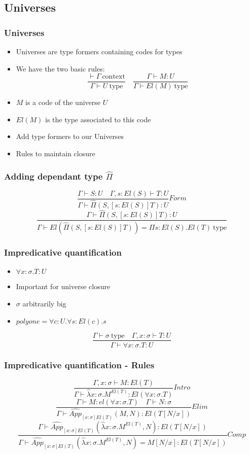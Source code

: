 \documentclass[aspectratio=169]{beamer}
\newcommand{\cntxt}{\ \mathrm{context}}
\newcommand{\typ}{\ \mathrm{type}}
\newcommand{\C}{Comp}
\newcommand{\Intro}{Intro}
\newcommand{\F}{Form}
\newcommand{\E}{Elim}
\newcommand{\Pich}{\hat{\Pi}}
\newcommand{\Appch}[2]{\hat{App}_{[x:\sigma]El(T)}(#1,#2)}
\newcommand{\lambdach}{\hat{\lambda} x:\sigma.M^{El(T)}}
\newcommand{\Gamdash}{\Gamma\vdash}
\begin{document}
    \subsection{Universes}
    \begin{frame}
        \frametitle{Universes}
        \begin{itemize}
            \item Universes are type formers containing codes for types
            \item We have the two basic rules:
            $$\frac{\vdash \Gamma \cntxt}{\Gamma \vdash U \typ}\quad\frac{\Gamma \vdash M:U}{\Gamdash El(M)\typ}$$
            \item $M$ is a code of the universe $U$
            \item $El(M)$ is the type associated to this code
            \item Add type formers to our Universes
            \item Rules to maintain closure
        \end{itemize}
    \end{frame}
    \begin{frame}
        \frametitle{Adding dependant type $\Pich$}
        $$\frac{\Gamma \vdash S:U\quad \Gamma,s:El(S)\vdash T:U}{\Gamma \vdash \Pich(S,[s:El(S)]T):U}\F$$
        \vspace{15pt}
        $$\frac{\Gamdash\Pich(S,[s:El(S)]T):U}{\Gamdash El(\Pich(S,[s:El(S)]T)) = \Pi s:El(S).El(T) \typ}$$
    \end{frame}
    \begin{frame}
        \frametitle{Impredicative quantification}
        \begin{itemize}
            \item $\forall x:\sigma.T:U$
            \item Important for universe closure
            \item $\sigma$ arbitrarily big
            \item $polyone = \forall c:U.\forall s:El(c).s$
        \end{itemize}
        \vspace{15pt}
        $$\frac{\Gamdash\sigma\typ\quad\Gamma,x:\sigma\vdash T:U}{\Gamdash\forall x:\sigma.T:U}$$
    \end{frame}
    \begin{frame}
        \frametitle{Impredicative quantification - Rules}
        $$\frac{\Gamma,x:\sigma\vdash M:El(T)}{\Gamdash\lambdach:El(\forall x:\sigma.T)}\Intro$$
        \vspace{10pt}
        $$\frac{\Gamdash M:el(\forall x:\sigma.T)\quad\Gamdash N:\sigma}{\Gamdash\Appch{M}{N}:El(T[N/x])}\E$$
        \vspace{10pt}
        $$\frac{\Gamdash\Appch{\lambdach}{N}:El(T[N/x])}{\Gamdash\Appch{\lambdach}{N}=M[N/x]:El(T[N/x])}\C$$
    \end{frame}
\end{document}

